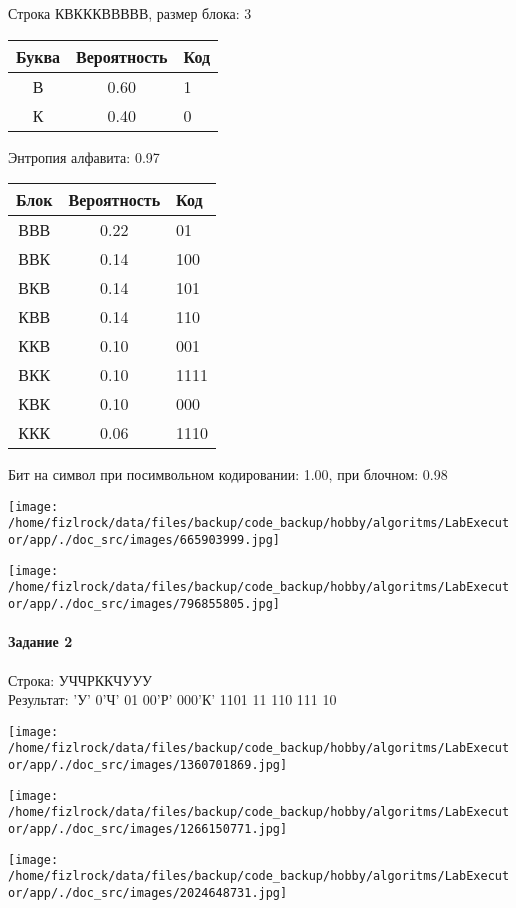 \documentclass[a4paper, 12pt]{article}
\begin{document}
Строка КВКККВВВВВ, размер блока: 3
\begin{center}
 \begin{tabular}{ |c|c|l| } 
  \hline
     Буква & Вероятность & Код\\ \hline
В & 0.60 & 1\\\hline
К & 0.40 & 0
\\ \hline \end{tabular}
\end{center}
Энтропия алфавита: 0.97
\begin{center}
 \begin{tabular}{ |c|c|l| } 
  \hline
     Блок & Вероятность & Код\\ \hline
ВВВ & 0.22 & 01\\\hline
ВВК & 0.14 & 100\\\hline
ВКВ & 0.14 & 101\\\hline
КВВ & 0.14 & 110\\\hline
ККВ & 0.10 & 001\\\hline
ВКК & 0.10 & 1111\\\hline
КВК & 0.10 & 000\\\hline
ККК & 0.06 & 1110
\\ \hline \end{tabular}
\end{center}
Бит на символ при посимвольном кодировании: 1.00, при блочном: 0.98

\texttt{[image: /home/fizlrock/data/files/backup/code\_backup/hobby/algoritms/LabExecutor/app/./doc\_src/images/665903999.jpg]}

\texttt{[image: /home/fizlrock/data/files/backup/code\_backup/hobby/algoritms/LabExecutor/app/./doc\_src/images/796855805.jpg]}
\pagebreak
\paragraph{Задание 2}

Строка: 
УЧЧРККЧУУУ\\
Результат: 'У' 0'Ч' 01 00'Р' 000'К' 1101 11 110 111 10

\texttt{[image: /home/fizlrock/data/files/backup/code\_backup/hobby/algoritms/LabExecutor/app/./doc\_src/images/1360701869.jpg]}

\texttt{[image: /home/fizlrock/data/files/backup/code\_backup/hobby/algoritms/LabExecutor/app/./doc\_src/images/1266150771.jpg]}

\texttt{[image: /home/fizlrock/data/files/backup/code\_backup/hobby/algoritms/LabExecutor/app/./doc\_src/images/2024648731.jpg]}
\end{document}
